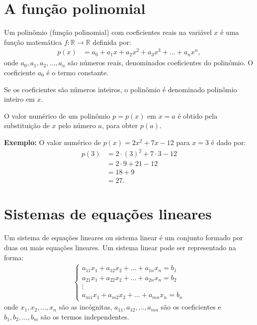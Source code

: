 \documentclass[12pt, a4paper]{article}
\begin{document}
\section{A função polinomial}\nocite{polinomio}
Um polinômio (função polinomial) com coeficientes reais na variável $x$ é uma função matemática $f : \mathbb{R} \rightarrow \mathbb{R}$ definida por:
\begin{align*}
p(x) &= a_0 + a_1 x + a_2 x^2 + a_3 x^3 + \ldots + a_n x^n,
\end{align*}
onde $a_0, a_1, a_2, \ldots, a_n$ são números reais, denominados coeficientes do polinômio. O coeficiente $a_0$ é o termo constante.

Se os coeficientes são números inteiros, o polinômio é denominado polinômio inteiro em $x$.
%

O valor numérico de um polinômio $p = p(x)$ em $x = a$ é obtido pela substituição de $x$ pelo número $a$, para obter $p(a)$.

\textbf{Exemplo:} O valor numérico de $p(x) = 2x^2 + 7x - 12$ para $x=3$ é dado por:
\begin{align*}
p(3) &= 2 \cdot (3)^2 + 7 \cdot 3 - 12 \\
&= 2 \cdot 9 + 21 - 12 \\
&= 18 + 9 \\
&= 27.
\end{align*}

\section{Sistemas de equações lineares}\nocite{sistema}
Um sistema de equações lineares ou sistema linear é um conjunto formado por duas ou mais equações lineares. Um sistema linear pode ser representado na forma:
\begin{align}
\begin{cases}
a_{11} x_1 + a_{12} x_2 + \ldots + a_{1n} x_n = b_1 \\
a_{21} x_1 + a_{22} x_2 + \ldots + a_{2n} x_n = b_ 2 \\
\vdots \\
a_{m1} x_1 + a_{m2} x_2 + \ldots + a_{mn} x_n = b_n
\end{cases} \label{eq:sis}
\end{align}
onde $x_1, x_2, \ldots, x_n$ são as incógnitas, $a_{11}, a_{12}, \ldots, a_{mn}$ são os coeficientes e $b_1, b_2, \ldots, b_m$ são os termos independentes.
\end{document}
